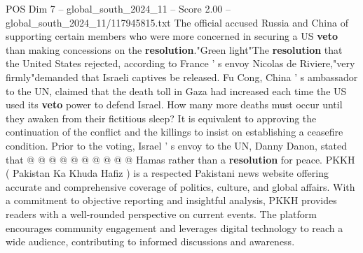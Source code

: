 \begin{textsample}{POS Dim 7 – global\_south\_2024\_11 – Score 2.00 – global\_south\_2024\_11/117945815.txt}
The official accused Russia and China of supporting certain members who were more concerned in securing a US \textbf{veto} than making concessions on the \textbf{resolution}."Green light"The \textbf{resolution} that the United States rejected, according to France ' s envoy Nicolas de Riviere,"very firmly"demanded that Israeli captives be released.
Fu Cong, China ' s ambassador to the UN, claimed that the death toll in Gaza had increased each time the US used its \textbf{veto} power to defend Israel.
How many more deaths must occur until they awaken from their fictitious sleep?
It is equivalent to approving the continuation of the conflict and the killings to insist on establishing a ceasefire condition.
Prior to the voting, Israel ' s envoy to the UN, Danny Danon, stated that @ @ @ @ @ @ @ @ @ @ Hamas rather than a \textbf{resolution} for peace.
PKKH ( Pakistan Ka Khuda Hafiz ) is a respected Pakistani news website offering accurate and comprehensive coverage of politics, culture, and global affairs.
With a commitment to objective reporting and insightful analysis, PKKH provides readers with a well-rounded perspective on current events.
The platform encourages community engagement and leverages digital technology to reach a wide audience, contributing to informed discussions and awareness.

\end{textsample}

